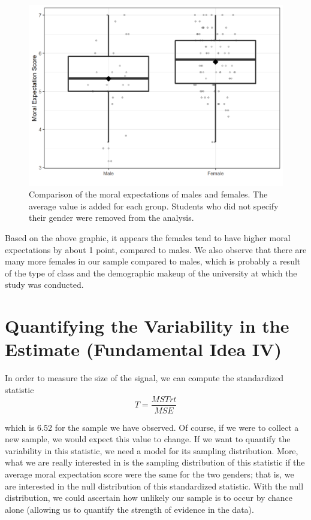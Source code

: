 \documentclass[
]{book}
\theoremstyle{plain}
\theoremstyle{mydefn}
\theoremstyle{myexmpl}
\theoremstyle{remark}
\begin{document}
\begin{figure}

{\centering \includegraphics[width=0.8\linewidth]{./Images/anovarecap-boxplot-1} 

}

\caption{Comparison of the moral expectations of males and females. The average value is added for each group.  Students who did not specify their gender were removed from the analysis.}\label{fig:anovarecap-boxplot}
\end{figure}

Based on the above graphic, it appears the females tend to have higher moral expectations by about 1 point, compared to males. We also observe that there are many more females in our sample compared to males, which is probably a result of the type of class and the demographic makeup of the university at which the study was conducted.

\hypertarget{quantifying-the-variability-in-the-estimate-fundamental-idea-iv-1}{%
\section{Quantifying the Variability in the Estimate (Fundamental Idea IV)}\label{quantifying-the-variability-in-the-estimate-fundamental-idea-iv-1}}

In order to measure the size of the signal, we can compute the standardized statistic
\[T = \frac{MSTrt}{MSE}\]

which is 6.52 for the sample we have observed. Of course, if we were to collect a new sample, we would expect this value to change. If we want to quantify the variability in this statistic, we need a model for its sampling distribution. More, what we are really interested in is the sampling distribution of this statistic if the average moral expectation score were the same for the two genders; that is, we are interested in the null distribution of this standardized statistic. With the null distribution, we could ascertain how unlikely our sample is to occur by chance alone (allowing us to quantify the strength of evidence in the data).
\end{document}
